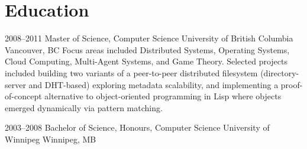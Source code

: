 \documentclass[11pt,letterpaper,sans]{moderncv}
\begin{document}
\section{Education}

\cventry
  {2008--2011}
  {Master of Science, Computer Science}
  {University of British Columbia}
  {Vancouver, BC}
  {}
  {
    Focus areas included Distributed Systems, Operating Systems, Cloud Computing, Multi-Agent Systems, and Game Theory. Selected projects included building two variants of a peer-to-peer distributed filesystem (directory-server and DHT-based) exploring metadata scalability, and implementing a proof-of-concept alternative to object-oriented programming in Lisp where objects emerged dynamically via pattern matching.
  }

\cventry
  {2003--2008}
  {Bachelor of Science, Honours, Computer Science}
  {University of Winnipeg}
  {Winnipeg, MB}
  {}
  {}
\end{document}
